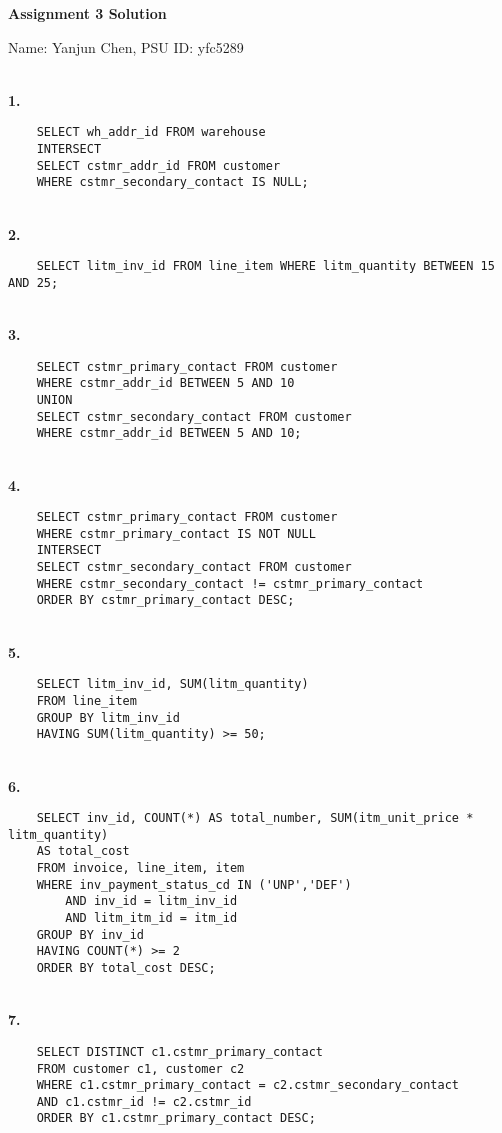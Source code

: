 \documentclass[letterpaper,11pt]{article}
\newcommand{\Paragraph}[1]{~\vspace*{-0.7\baselineskip}\\{\bf #1}}
\begin{document}
\begin{center}
	{\LARGE \bf Assignment 3 Solution}
	
	{\large
	Name: Yanjun Chen, PSU ID: yfc5289}
\end{center}

\Paragraph{1. }
\begin{verbatim}
	SELECT wh_addr_id FROM warehouse
	INTERSECT
	SELECT cstmr_addr_id FROM customer
	WHERE cstmr_secondary_contact IS NULL;
\end{verbatim}

\Paragraph{2.}
\begin{verbatim}
	SELECT litm_inv_id FROM line_item WHERE litm_quantity BETWEEN 15 AND 25;
\end{verbatim}
                                                                         
\Paragraph{3. }
\begin{verbatim}
	SELECT cstmr_primary_contact FROM customer
	WHERE cstmr_addr_id BETWEEN 5 AND 10
	UNION
	SELECT cstmr_secondary_contact FROM customer
	WHERE cstmr_addr_id BETWEEN 5 AND 10;
\end{verbatim}


\Paragraph{4. }
\begin{verbatim}
	SELECT cstmr_primary_contact FROM customer 
	WHERE cstmr_primary_contact IS NOT NULL
	INTERSECT
	SELECT cstmr_secondary_contact FROM customer 
	WHERE cstmr_secondary_contact != cstmr_primary_contact
	ORDER BY cstmr_primary_contact DESC;
\end{verbatim}


\Paragraph{5. }
\begin{verbatim}
	SELECT litm_inv_id, SUM(litm_quantity)
	FROM line_item
	GROUP BY litm_inv_id
	HAVING SUM(litm_quantity) >= 50;
\end{verbatim}

\newpage
\Paragraph{6.}
\begin{verbatim}
	SELECT inv_id, COUNT(*) AS total_number, SUM(itm_unit_price * litm_quantity) 
	AS total_cost
	FROM invoice, line_item, item
	WHERE inv_payment_status_cd IN ('UNP','DEF')
		AND inv_id = litm_inv_id
		AND litm_itm_id = itm_id
	GROUP BY inv_id
	HAVING COUNT(*) >= 2
	ORDER BY total_cost DESC;
\end{verbatim}


\Paragraph{7.}
\begin{verbatim}
	SELECT DISTINCT c1.cstmr_primary_contact
	FROM customer c1, customer c2
	WHERE c1.cstmr_primary_contact = c2.cstmr_secondary_contact
	AND c1.cstmr_id != c2.cstmr_id
	ORDER BY c1.cstmr_primary_contact DESC;
\end{verbatim}
\end{document}
